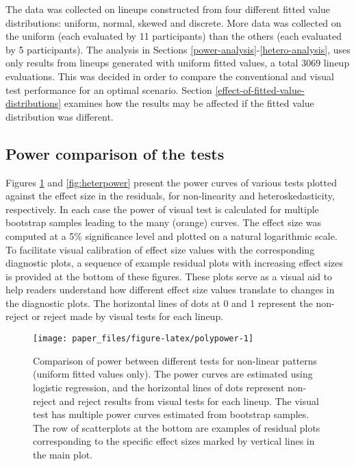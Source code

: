 \documentclass[]{interact}
\theoremstyle{plain}%
\theoremstyle{definition}
\theoremstyle{remark}
\begin{document}
The data was collected on lineups constructed from four different fitted
value distributions: uniform, normal, skewed and discrete. More data was
collected on the uniform (each evaluated by 11 participants) than the
others (each evaluated by 5 participants). The analysis in Sections
\ref{power-analysis}-\ref{hetero-analysis}, uses only results from
lineups generated with uniform fitted values, a total 3069 lineup
evaluations. This was decided in order to compare the conventional and
visual test performance for an optimal scenario. Section
\ref{effect-of-fitted-value-distributions} examines how the results may
be affected if the fitted value distribution was different.

\hypertarget{power-comparison-of-the-tests}{%
\subsection{\texorpdfstring{Power comparison of the
tests\label{power-analysis}}{Power comparison of the tests}}\label{power-comparison-of-the-tests}}

Figures \ref{fig:polypower} and \ref{fig:heterpower} present the power
curves of various tests plotted against the effect size in the
residuals, for non-linearity and heteroskedasticity, respectively. In
each case the power of visual test is calculated for multiple bootstrap
samples leading to the many (orange) curves. The effect size was
computed at a 5\% significance level and plotted on a natural
logarithmic scale. To facilitate visual calibration of effect size
values with the corresponding diagnostic plots, a sequence of example
residual plots with increasing effect sizes is provided at the bottom of
these figures. These plots serve as a visual aid to help readers
understand how different effect size values translate to changes in the
diagnostic plots. The horizontal lines of dots at 0 and 1 represent the
non-reject or reject made by visual tests for each lineup.

\begin{figure}

{\centering \texttt{[image: paper\_files/figure-latex/polypower-1]} 

}

\caption{Comparison of power between different tests for non-linear patterns (uniform fitted values only). The power curves are estimated using logistic regression, and the horizontal lines of dots represent non-reject and reject results from visual tests for each lineup. The visual test has multiple power curves estimated from bootstrap samples. The row of scatterplots at the bottom are examples of residual plots corresponding to the specific effect sizes marked by vertical lines in the main plot.}\label{fig:polypower}
\end{figure}
\end{document}
